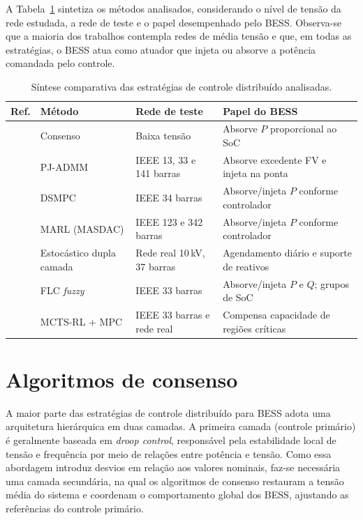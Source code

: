 A Tabela~\ref{tab:comparacao} sintetiza os métodos analisados, considerando o nível de tensão da rede estudada, a rede de teste e o papel desempenhado pelo BESS. Observa-se que a maioria dos trabalhos contempla redes de média tensão e que, em todas as estratégias, o BESS atua como atuador que injeta ou absorve a potência comandada pelo controle.

\begin{table}[!htb]
  \centering
  \caption{Síntese comparativa das estratégias de controle distribuído analisadas.}
  \label{tab:comparacao}
  \footnotesize
  \begin{tabular}{@{}llll@{}}
    \toprule
    \textbf{Ref.} & \textbf{Método} & \textbf{Rede de teste} & \textbf{Papel do BESS} \\
    \midrule
    \cite{xing2022}    & Consenso                  & Baixa tensão            & Absorve $P$ proporcional ao SoC \\
    \cite{far2023}     & PJ-ADMM                   & IEEE 13, 33 e 141 barras & Absorve excedente FV e injeta na ponta \\
    \cite{ma2024}      & DSMPC                     & IEEE 34 barras          & Absorve/injeta $P$ conforme controlador \\
    \cite{cao2021}     & MARL (MASDAC)             & IEEE 123 e 342 barras   & Absorve/injeta $P$ conforme controlador \\
    \cite{emarati2021} & Estocástico dupla camada  & Rede real 10\,kV, 37 barras & Agendamento diário e suporte de reativos \\
    \cite{fuzzy2022}   & FLC \emph{fuzzy}          & IEEE 33 barras          & Absorve/injeta $P$ e $Q$; grupos de SoC \\
    \cite{alsaffar2020} & MCTS-RL + MPC            & IEEE 33 barras e rede real & Compensa capacidade de regiões críticas \\
    \bottomrule
  \end{tabular}
  \par\vspace{2pt}
\end{table}

\section{Algoritmos de consenso}
\label{sec:consenso}

A maior parte das estratégias de controle distribuído para BESS adota uma arquitetura hierárquica em 
duas camadas. A primeira camada (controle primário) é geralmente baseada em \emph{droop control}, 
responsável pela estabilidade local de tensão e frequência por meio de relações entre potência e tensão. 
Como essa abordagem introduz desvios em relação aos valores nominais, faz-se necessária uma camada 
secundária, na qual os algoritmos de consenso restauram a tensão média do sistema e coordenam o 
comportamento global dos BESS, ajustando as referências do controle primário.


